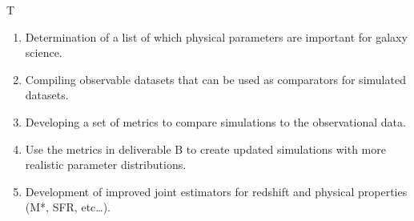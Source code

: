 \begin{tasklist}{T}
\begin{task}
{\begin{enumerate}
\item Determination of a list of which physical parameters are important for galaxy science.
\item Compiling observable datasets that can be used as comparators for simulated datasets.
\item Developing a set of metrics to compare simulations to the observational data.
\item Use the metrics in deliverable B to create updated simulations with more realistic parameter distributions.
\item Development of improved joint estimators for redshift and physical properties (M*, SFR, etc…).
\end{enumerate}
}
\end{task}
\end{tasklist}

